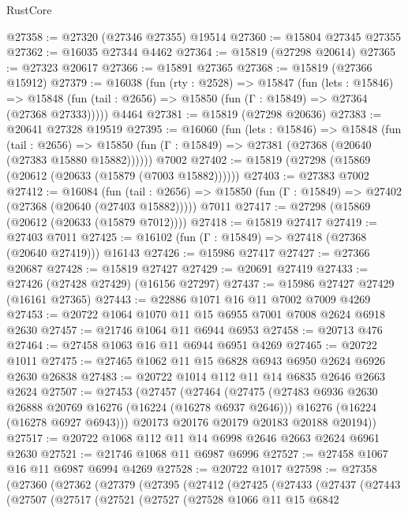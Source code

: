 \begin{lexlean}{RustCore}
\begin{coremodule}
@27358 := @27320 (@27346 @27355) @19514
@27360 := @15804 @27345 @27355
@27362 := @16035 @27344 @4462
@27364 := @15819 (@27298 @20614)
@27365 := @27323 @20617
@27366 := @15891 @27365
@27368 := @15819 (@27366 @15912)
@27379 := @16038
    (fun (rty : @2528) =>
    @15847
      (fun (lets : @15846) =>
      @15848 (fun (tail : @2656) => @15850 (fun (Γ : @15849) => @27364 (@27368 @27333)))))
    @4464
@27381 := @15819 (@27298 @20636)
@27383 := @20641 @27328 @19519
@27395 := @16060
    (fun (lets : @15846) =>
    @15848
      (fun (tail : @2656) =>
      @15850 (fun (Γ : @15849) => @27381 (@27368 (@20640 (@27383 @15880 @15882))))))
    @7002
@27402 := @15819 (@27298 (@15869 (@20612 (@20633 (@15879 (@7003 @15882))))))
@27403 := @27383 @7002
@27412 := @16084
    (fun (tail : @2656) => @15850 (fun (Γ : @15849) => @27402 (@27368 (@20640 (@27403 @15882)))))
    @7011
@27417 := @27298 (@15869 (@20612 (@20633 (@15879 @7012))))
@27418 := @15819 @27417
@27419 := @27403 @7011
@27425 := @16102 (fun (Γ : @15849) => @27418 (@27368 (@20640 @27419))) @16143
@27426 := @15986 @27417
@27427 := @27366 @20687
@27428 := @15819 @27427
@27429 := @20691 @27419
@27433 := @27426 (@27428 @27429) (@16156 @27297)
@27437 := @15986 @27427 @27429 (@16161 @27365)
@27443 := @22886 @1071 @16 @11 @7002 @7009 @4269
@27453 := @20722 @1064 @1070 @11 @15 @6955 @7001 @7008 @2624 @6918 @2630
@27457 := @21746 @1064 @11 @6944 @6953
@27458 := @20713 @476
@27464 := @27458 @1063 @16 @11 @6944 @6951 @4269
@27465 := @20722 @1011
@27475 := @27465 @1062 @11 @15 @6828 @6943 @6950 @2624 @6926 @2630 @26838
@27483 := @20722 @1014 @112 @11 @14 @6835 @2646 @2663 @2624
@27507 := @27453
    (@27457
      (@27464
        (@27475
          (@27483 @6936 @2630 @26888 @20769 @16276 (@16224 (@16278 @6937 @2646)))
          @16276
          (@16224 (@16278 @6927 @6943)))
        @20173
        @20176
        @20179
        @20183
        @20188
        @20194))
@27517 := @20722 @1068 @112 @11 @14 @6998 @2646 @2663 @2624 @6961 @2630
@27521 := @21746 @1068 @11 @6987 @6996
@27527 := @27458 @1067 @16 @11 @6987 @6994 @4269
@27528 := @20722 @1017
@27598 := @27358
    (@27360
      (@27362
        (@27379
          (@27395
            (@27412
              (@27425
                (@27433
                  (@27437
                    (@27443
                      (@27507
                        (@27517
                          (@27521
                            (@27527
                              (@27528
                                @1066
                                @11
                                @15
                                @6842

\end{coremodule}
\end{lexlean}
